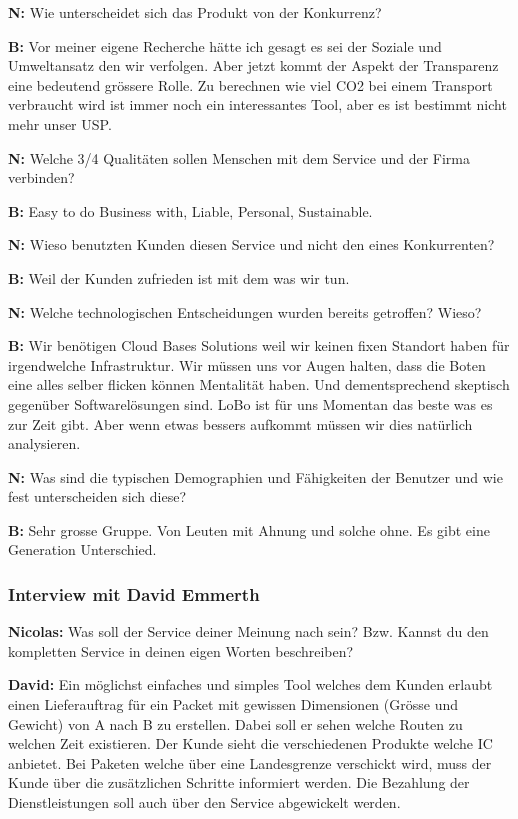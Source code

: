 \textbf{N:} Wie unterscheidet sich das Produkt von der Konkurrenz?

\textbf{B:} Vor meiner eigene Recherche hätte ich gesagt es sei der Soziale und Umweltansatz den wir verfolgen. Aber jetzt kommt der Aspekt der Transparenz eine bedeutend grössere Rolle. Zu berechnen wie viel CO2 bei einem Transport verbraucht wird ist immer noch ein interessantes Tool, aber es ist bestimmt nicht mehr unser USP.

\textbf{N:} Welche 3/4 Qualitäten sollen Menschen mit dem Service und der Firma verbinden?

\textbf{B:} Easy to do Business with, Liable, Personal, Sustainable.

\textbf{N:} Wieso benutzten Kunden diesen Service und nicht den eines Konkurrenten?

\textbf{B:} Weil der Kunden zufrieden ist mit dem was wir tun.

\textbf{N:} Welche technologischen Entscheidungen wurden bereits getroffen? Wieso?

\textbf{B:} Wir benötigen Cloud Bases Solutions weil wir keinen fixen Standort haben für irgendwelche Infrastruktur.
Wir müssen uns vor Augen halten, dass die Boten eine alles selber flicken können Mentalität haben. Und dementsprechend skeptisch gegenüber Softwarelösungen sind. LoBo ist für uns Momentan das beste was es zur Zeit gibt. Aber wenn etwas bessers aufkommt müssen wir dies natürlich analysieren.

\textbf{N:} Was sind die typischen Demographien und Fähigkeiten der Benutzer und wie fest unterscheiden sich diese?

\textbf{B:} Sehr grosse Gruppe. Von Leuten mit Ahnung und solche ohne. Es gibt eine Generation Unterschied.

\subsubsection{Interview mit David Emmerth}

\textbf{Nicolas:} Was soll der Service deiner Meinung nach sein? Bzw. Kannst du den kompletten Service in deinen eigen Worten beschreiben?

\textbf{David:} Ein möglichst einfaches und simples Tool welches dem Kunden erlaubt einen Lieferauftrag für ein Packet mit gewissen Dimensionen (Grösse und Gewicht) von A nach B zu erstellen. Dabei soll er sehen welche Routen zu welchen Zeit existieren. Der Kunde sieht die verschiedenen Produkte welche IC anbietet. Bei Paketen welche über eine Landesgrenze verschickt wird, muss der Kunde über die zusätzlichen Schritte informiert werden. Die Bezahlung der Dienstleistungen soll auch über den Service abgewickelt werden.

